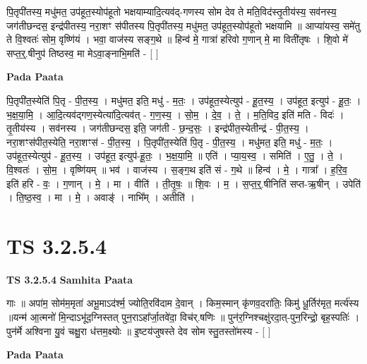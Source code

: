 \documentclass[17pt]{extarticle}
\begin{document}
पि॒तृपी॑तस्य॒ मधु॑मत॒ उप॑हूत॒स्योप॑हूतो भक्षयाम्यादि॒त्यव॑द्-गणस्य सोम देव ते मति॒विद॑स्तृ॒तीय॑स्य॒ सव॑नस्य॒ जग॑तीछन्दस॒ इन्द्र॑पीतस्य॒ नरा॒शꣳ स॑पीतस्य पि॒तृपी॑तस्य॒ मधु॑मत॒ उप॑हूत॒स्योप॑हूतो भक्षयामि ॥ आप्या॑यस्व॒ समे॑तु ते वि॒श्वतः॑ सोम॒ वृष्णि॑यं । भवा॒ वाज॑स्य सङ्ग॒थे ॥ हिन्व॑ मे॒ गात्रा॑ हरिवो ग॒णान् मे॒ मा विती॑तृषः । शि॒वो मे॑ सप्त॒र्॒.षीनुप॑ तिष्ठस्व॒ मा मेऽवा॒ङ्नाभि॒मति॑ - [  ] \newline

\textbf{Pada Paata} \newline

पि॒तृपी॑त॒स्येति॑ पि॒तृ - पी॒त॒स्य॒ । मधु॑मत॒ इति॒ मधु॑ - म॒तः॒ । उप॑हूत॒स्येत्युप॑ - हू॒त॒स्य॒ । उप॑हूत॒ इत्युप॑ - हू॒तः॒ । भ॒क्ष॒या॒मि॒ । आ॒दि॒त्यव॑द्गण॒स्येत्या॑दि॒त्यव॑त् - ग॒ण॒स्य॒ । सो॒म॒ । दे॒व॒ । ते॒ । म॒ति॒विद॒ इति॑ मति - विदः॑ । तृ॒तीय॑स्य । सव॑नस्य । जग॑तीछन्दस॒ इति॒ जग॑ती - छ॒न्द॒सः॒ । इन्द्र॑पीत॒स्येतीन्द्र॑ - पी॒त॒स्य॒ । नरा॒शꣳस॑पीत॒स्येति॒ नरा॒शꣳस॑ - पी॒त॒स्य॒ । पि॒तृपी॑त॒स्येति॑ पि॒तृ - पी॒त॒स्य॒ । मधु॑मत॒ इति॒ मधु॑ - म॒तः॒ । उप॑हूत॒स्येत्युप॑ - हू॒त॒स्य॒ । उप॑हूत॒ इत्युप॑-हू॒तः॒ । भ॒क्ष॒या॒मि॒ ॥ एति॑ । प्या॒य॒स्व॒ । समिति॑ । ए॒तु॒ । ते॒ । वि॒श्वतः॑ । सो॒म॒ । वृष्णि॑यम् ॥ भव॑ । वाज॑स्य । स॒ङ्ग॒थ इति॑ सं - ग॒थे ॥ हिन्व॑ । मे॒ । गात्रा᳚ । ह॒रि॒व॒ इति॑ हरि - वः॒ । ग॒णान् । मे॒ । मा । वीति॑ । ती॒तृ॒षः॒ ॥ शि॒वः । म॒ । स॒प्त॒र्॒.षीनिति॑ सप्त-ऋ॒षीन् । उपेति॑ । ति॒ष्ठ॒स्व॒ । मा । मे॒ । अवाङ्॑ । नाभि᳚म् । अतीति॑ ।  \newline




\section*{ TS 3.2.5.4 }

\textbf{TS 3.2.5.4 } \newline
\textbf{Samhita Paata} \newline

गाः ॥ अपा॑म॒ सोम॑म॒मृता॑ अभू॒माऽद॑र्श्म॒ ज्योति॒रवि॑दाम दे॒वान् । किम॒स्मान् कृ॑णव॒दरा॑तिः॒ किमु॑ धू॒र्तिर॑मृत॒ मर्त्य॑स्य ॥यन्म॑ आ॒त्मनो॑ मि॒न्दाऽभू॑द॒ग्निस्तत् पुन॒राऽहा᳚र्जा॒तवे॑दा॒ विच॑र्.षणिः ॥ पुन॑र॒ग्निश्चक्षु॑रदा॒त्-पुन॒रिन्द्रो॒ बृह॒स्पतिः॑ । पुन॑र्मे अश्विना यु॒वं चक्षु॒रा ध॑त्तम॒क्ष्योः ॥ इ॒ष्टय॑जुषस्ते देव सोम स्तु॒तस्तो॑मस्य - [  ] \newline

\textbf{Pada Paata} \newline
\end{document}
